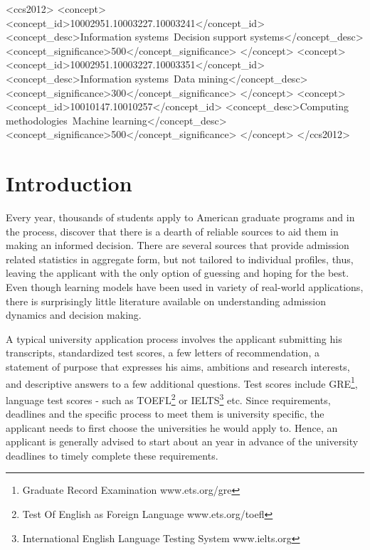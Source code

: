 \documentclass{sig-alternate-05-2015}
\begin{document}
%
%
\begin{CCSXML}
<ccs2012>
<concept>
<concept_id>10002951.10003227.10003241</concept_id>
<concept_desc>Information systems~Decision support systems</concept_desc>
<concept_significance>500</concept_significance>
</concept>
<concept>
<concept_id>10002951.10003227.10003351</concept_id>
<concept_desc>Information systems~Data mining</concept_desc>
<concept_significance>300</concept_significance>
</concept>
<concept>
<concept_id>10010147.10010257</concept_id>
<concept_desc>Computing methodologies~Machine learning</concept_desc>
<concept_significance>500</concept_significance>
</concept>
</ccs2012>
\end{CCSXML}


%
%

%
%
\printccsdesc



\section{Introduction}
\label{sec:intro}
Every year, thousands of students apply to American graduate programs and in the process, discover that there is a dearth of reliable sources to aid them in making an informed decision. There are several sources that provide admission related statistics in aggregate form, but not tailored to individual profiles, thus, leaving the applicant with the only option of guessing and hoping for the best. Even though learning models have been used in variety of real-world applications, there is surprisingly little literature available on understanding admission dynamics and decision making.

A typical university application process involves the applicant submitting his transcripts, standardized test scores, a few letters of recommendation, a statement of purpose that expresses his aims, ambitions and research interests, and descriptive answers to a few additional questions. Test scores include GRE\footnote{Graduate Record Examination \tiny{www.ets.org/gre}}, language test scores - such as TOEFL\footnote{Test Of English as Foreign Language \tiny{www.ets.org/toefl}} or IELTS\footnote{International English Language Testing System \tiny{www.ielts.org}} etc. Since requirements, deadlines and the specific process to meet them is university specific, the applicant needs to first choose the universities he would apply to. Hence, an applicant is generally advised to start about an year in advance of the university deadlines to timely complete these requirements.
\end{document}
